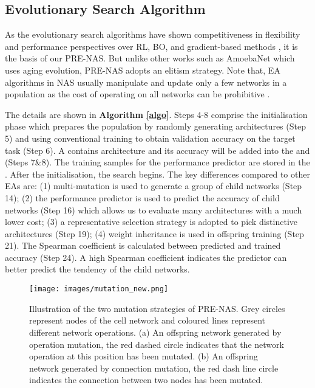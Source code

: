 \documentclass[sigconf]{acmart}
\begin{document}
\subsection{Evolutionary Search Algorithm}

As the evolutionary search algorithms \cite{Ref:07,Ref:08,Ref:27, Ref:36,Ref:37,Ref:60,Ref:62} have shown competitiveness in flexibility and performance perspectives over RL, BO, and gradient-based methods \cite{Ref:01,Ref:26,Ref:31,Ref:10}, it is the basis of our PRE-NAS. But unlike other works such as AmoebaNet \citep{Ref:08} which uses aging evolution, PRE-NAS adopts an elitism strategy. Note that, EA algorithms in NAS usually manipulate and update only a few networks in a population as the cost of operating on all networks can be prohibitive \cite{Ref:54}.

The details are shown in \textbf{Algorithm \ref{algo}}. Steps 4-8 comprise the initialisation phase which prepares the population by randomly generating  architectures (Step 5) and using conventional training to obtain validation accuracy on the target task (Step 6).  A  contains architecture and its accuracy will be added into the  and  (Steps 7\&8).   The training samples for the performance predictor are stored in the .  After the initialisation, the search begins. The key differences compared to other EAs are: (1) multi-mutation is used to generate a group of child networks (Step 14); (2) the performance predictor is used to predict the accuracy of child networks (Step 16) which allows us to evaluate many architectures with a much lower cost; (3) a representative selection strategy is adopted to pick distinctive architectures (Step 19); (4) weight inheritance is used in offspring training (Step 21). The Spearman coefficient is calculated between predicted and trained accuracy (Step 24).  A high Spearman coefficient indicates the predictor can better predict the tendency of the child networks.
 
  \begin{figure}[!h]
    \begin{center}
  	\texttt{[image: images/mutation\_new.png]}
  	\caption{Illustration of the two mutation strategies of PRE-NAS.  Grey circles represent nodes of the cell network and coloured lines represent different network operations. (a) An offspring network generated by operation mutation, the red dashed circle indicates that the network operation at this position has been mutated. (b) An offspring network generated by connection mutation, the red dash line circle indicates the connection between two nodes has been mutated.}
  	\label{mutation}
  	\end{center}
\end{figure} 
\end{document}
